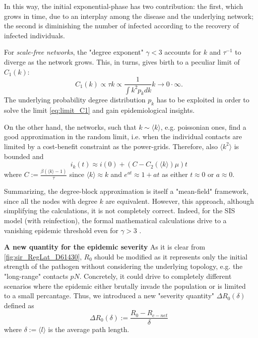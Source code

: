 \documentclass[a4paper,10pt,twoside]{book} %
\theoremstyle{definition}
\begin{document}
In this way, the initial exponential-phase has two contribution: the first, which grows in time, due to an interplay among the disease and the underlying network; the second is diminishing the number of infected according to the recovery of infected individuals.

For \textit{scale-free networks}, the "degree exponent" $\gamma<3$ accounts for $k$ and $\tau^{-1}$ to diverge as the network grows. This, in turns, gives birth to a peculiar limit of $C_1(k)$: \vspace{3mm}
\begin{equation}
	C_1(k)\propto \tau k \propto \frac{1}{\int k^2 p_k dk}k  \to 0 \cdot \infty.
	\label{eq:limit_C1}
\end{equation}
The underlying probability degree distribution $p_k$ has to be exploited in order to solve the limit \autoref{eq:limit_C1} and gain epidemiological insights.

On the other hand, the networks, such that $k \sim \langle k \rangle$, e.g. poissonian ones, find a good approximation in the random limit, i.e. when the individual contacts are limited by a cost-benefit constraint as the power-grids. Therefore, also $\langle k^2 \rangle $ is bounded and
\begin{equation}
	i_k(t) \approx i(0)  + \left(C - C_2(\langle k \rangle )\mu \right) t
\end{equation}
where $C:= \frac{\beta (\langle k \rangle -1)}{\tau}$ since $\langle k \rangle \approx k$ and $e^{at}\approx1+at$ as either $t\approx0$ or $a \approx 0$.

Summarizing, the degree-block approximation is itself a "mean-field" framework, since all the nodes with degree $k$  are equivalent. However, this approach, although simplifying the calculations, it is not completely correct. Indeed, for the SIS model (with reinfection), the formal mathematical calculations drive to a vanishing epidemic threshold even for $\gamma>3$ \cite{barabasi::2016networkbook}.

\textbf{A new quantity for the epidemic severity} 
\label{sec:def_epidemic_severity}
As it is clear from \autoref{fig:sir_RegLat_D61430}, $R_0$ should be modified as it represents only the initial strength of the pathogen without considering the underlying topology, e.g. the "long-range" contacts $pN$. Concretely, it could drive to completely different scenarios where the epidemic either brutally invade the population or is limited to a small percantage. Thus, we introduced a new "severity quantity" $ \Delta R_0 (\delta)$ defined as
\begin{equation}
	\Delta R_0 (\delta):= \frac{R_0 - R_{c-net}}{\delta}
	\label{eq:def_DR0delta}
\end{equation}
where $\delta:=\langle l \rangle $ is the average path length.
\end{document}
